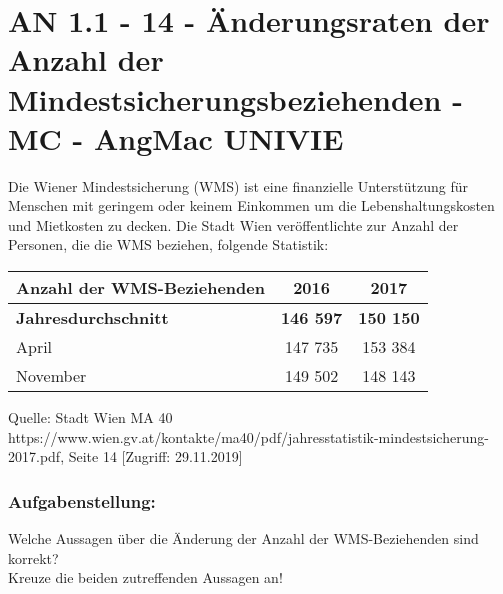 \section{AN 1.1 - 14 - Änderungsraten der Anzahl der Mindestsicherungsbeziehenden - MC - AngMac UNIVIE}

\begin{beispiel}[AN 1.1]{1}
Die Wiener Mindestsicherung (WMS) ist eine finanzielle Unterstützung für Menschen mit geringem oder keinem Einkommen um die Lebenshaltungskosten und Mietkosten zu decken. Die Stadt Wien veröffentlichte zur Anzahl der Personen, die die WMS beziehen, folgende Statistik: \newline

\begin{tabular}{l|c|c} 
\rowcolor{lightgray}
Anzahl der WMS-Beziehenden & 2016 & 2017 \\ \hline
\textbf{Jahresdurchschnitt} & \textbf{ 146 597} & \textbf{150 150} \\ 
April & 147 735 & 153 384 \\ 
November & 149 502 & 148 143  
\end{tabular} \newline

\begin{singlespace}\scriptsize Quelle: Stadt Wien MA 40 https://www.wien.gv.at/kontakte/ma40/pdf/jahresstatistik-mindestsicherung-2017.pdf, Seite 14 [Zugriff: 29.11.2019]\end{singlespace}
\normalsize


\subsubsection{Aufgabenstellung:}
Welche Aussagen über die Änderung der Anzahl der WMS-Beziehenden sind korrekt? \\
Kreuze die beiden zutreffenden Aussagen an!
\end{beispiel}